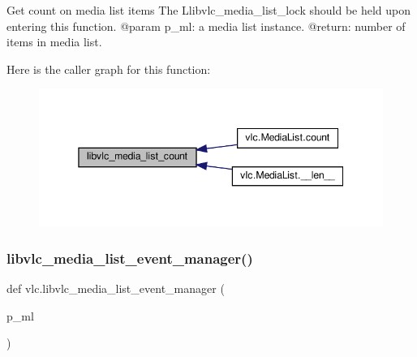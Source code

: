 \begin{DoxyVerb}Get count on media list items
The L{libvlc_media_list_lock} should be held upon entering this function.
@param p_ml: a media list instance.
@return: number of items in media list.
\end{DoxyVerb}
 Here is the caller graph for this function\+:
\nopagebreak
\begin{figure}[H]
\begin{center}
\leavevmode
\includegraphics[width=345pt]{namespacevlc_ac1e38d46f64d31d883c7404de7d2fa19_icgraph}
\end{center}
\end{figure}
\mbox{\label{namespacevlc_a624be8eb190ea1c0d3f6b275efaa736c}} 
\subsubsection{\texorpdfstring{libvlc\+\_\+media\+\_\+list\+\_\+event\+\_\+manager()}{libvlc\_media\_list\_event\_manager()}}
{\footnotesize\ttfamily def vlc.\+libvlc\+\_\+media\+\_\+list\+\_\+event\+\_\+manager (\begin{DoxyParamCaption}\item[{}]{p\+\_\+ml }\end{DoxyParamCaption})}

